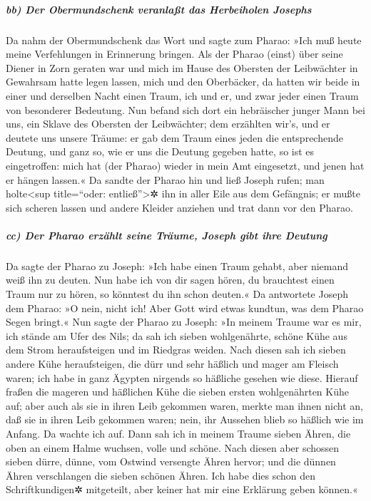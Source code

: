 \hypertarget{bb-der-obermundschenk-veranlauxdft-das-herbeiholen-josephs}{%
\subparagraph{bb) Der Obermundschenk veranlaßt das Herbeiholen
Josephs}\label{bb-der-obermundschenk-veranlauxdft-das-herbeiholen-josephs}}

 Da nahm der Obermundschenk das Wort und sagte zum Pharao:
»Ich muß heute meine Verfehlungen in Erinnerung bringen. 
Als der Pharao (einst) über seine Diener in Zorn geraten war und mich im
Hause des Obersten der Leibwächter in Gewahrsam hatte legen lassen, mich
und den Oberbäcker,  da hatten wir beide in einer und
derselben Nacht einen Traum, ich und er, und zwar jeder einen Traum von
besonderer Bedeutung.  Nun befand sich dort ein
hebräischer junger Mann bei uns, ein Sklave des Obersten der
Leibwächter; dem erzählten wir's, und er deutete uns unsere Träume: er
gab dem Traum eines jeden die entsprechende Deutung,  und
ganz so, wie er uns die Deutung gegeben hatte, so ist es eingetroffen:
mich hat (der Pharao) wieder in mein Amt eingesetzt, und jenen hat er
hängen lassen.«  Da sandte der Pharao hin und ließ Joseph
rufen; man holte\textless sup title=``oder: entließ''\textgreater✲ ihn
in aller Eile aus dem Gefängnis; er mußte sich scheren lassen und andere
Kleider anziehen und trat dann vor den Pharao.

\hypertarget{cc-der-pharao-erzuxe4hlt-seine-truxe4ume-joseph-gibt-ihre-deutung}{%
\subparagraph{cc) Der Pharao erzählt seine Träume, Joseph gibt ihre
Deutung}\label{cc-der-pharao-erzuxe4hlt-seine-truxe4ume-joseph-gibt-ihre-deutung}}

 Da sagte der Pharao zu Joseph: »Ich habe einen Traum
gehabt, aber niemand weiß ihn zu deuten. Nun habe ich von dir sagen
hören, du brauchtest einen Traum nur zu hören, so könntest du ihn schon
deuten.«  Da antwortete Joseph dem Pharao: »O nein, nicht
ich! Aber Gott wird etwas kundtun, was dem Pharao Segen bringt.«
 Nun sagte der Pharao zu Joseph: »In meinem Traume war es
mir, ich stände am Ufer des Nils;  da sah ich sieben
wohlgenährte, schöne Kühe aus dem Strom heraufsteigen und im Riedgras
weiden.  Nach diesen sah ich sieben andere Kühe
heraufsteigen, die dürr und sehr häßlich und mager am Fleisch waren; ich
habe in ganz Ägypten nirgends so häßliche gesehen wie diese.
 Hierauf fraßen die mageren und häßlichen Kühe die sieben
ersten wohlgenährten Kühe auf;  aber auch als sie in
ihren Leib gekommen waren, merkte man ihnen nicht an, daß sie in ihren
Leib gekommen waren; nein, ihr Aussehen blieb so häßlich wie im Anfang.
Da wachte ich auf.  Dann sah ich in meinem Traume sieben
Ähren, die oben an einem Halme wuchsen, volle und schöne.
 Nach diesen aber schossen sieben dürre, dünne, vom
Ostwind versengte Ähren hervor;  und die dünnen Ähren
verschlangen die sieben schönen Ähren. Ich habe dies schon den
Schriftkundigen✲ mitgeteilt, aber keiner hat mir eine Erklärung geben
können.«

